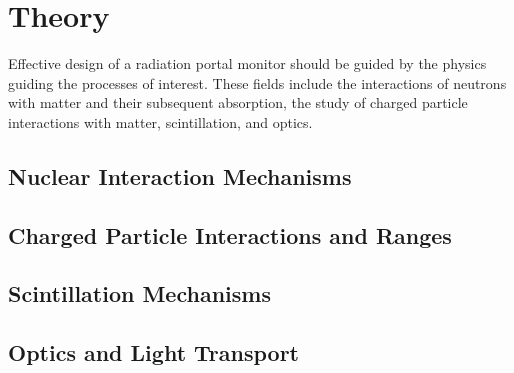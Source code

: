 \chapter{Theory}
\label{chap:theory}
Effective design of a radiation portal monitor should be guided by the physics guiding the processes of interest.
These fields include the interactions of neutrons with matter and their subsequent absorption, the study of charged particle interactions with matter, scintillation, and optics.
 
\section{Nuclear Interaction Mechanisms}
\label{sec:NuclearInteractions}



\section{Charged Particle Interactions and Ranges}
\label{sec:InteractionsAndRange}


\section{Scintillation Mechanisms}
\label{sec:ScintMechanics}


\section{Optics and Light Transport}
\label{sec:OpticsTheory}
